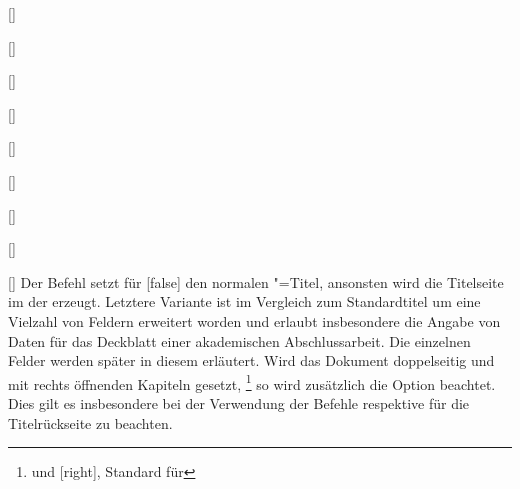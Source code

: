 \begin{Declaration}{}
\begin{Declaration}[v2.02]{%
  []%
}
\begin{Declaration}[v2.02]{[\PSet]}{%
}
\begin{Declaration}[v2.03]{[\PSet]}{%
}
\begin{Declaration}[v2.03]{[\PSet]}{%
}
\begin{Declaration}[v2.03]{%
  []%
}{}
\begin{Declaration}[v2.03]{%
  []
}{}
\begin{Declaration}[v2.03]{[\PSet]}{%
}
\begin{Declaration}[v2.03]{[\PSet]}{%
}
\begin{Declaration}[v2.03]{[\PSet]}{%
}
\printdeclarationlist%
%
%
%
Der Befehl  setzt für [false] den normalen 
\KOMAScript"=Titel{}, ansonsten wird die Titelseite im \CD der \TnUD erzeugt. 
Letztere Variante ist im Vergleich zum Standardtitel um eine Vielzahl von 
Feldern erweitert worden und erlaubt insbesondere die Angabe von Daten für das 
Deckblatt einer akademischen Abschlussarbeit. Die einzelnen Felder werden 
später in diesem \autorefname erläutert. Wird das Dokument doppelseitig und mit 
rechts öffnenden Kapiteln gesetzt,%
\footnote{%
   und [right], Standard für 
}
so wird zusätzlich die Option  beachtet. Dies gilt es 
insbesondere bei der Verwendung der Befehle  respektive 
 für die Titelrückseite zu beachten.


\end{Declaration}
\end{Declaration}
\end{Declaration}
\end{Declaration}
\end{Declaration}
\end{Declaration}
\end{Declaration}
\end{Declaration}
\end{Declaration}
\end{Declaration}
